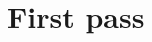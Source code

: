 \documentclass[11pt]{article}
\author{Mridul Gupta}
\date{\today}
\title{}
\begin{document}
\section{First pass}

% 
% 
% 
% 
\end{document}
